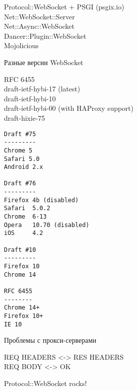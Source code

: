 \documentclass[14pt]{beamer}
\begin{document}
\begin{frame}
    \begin{center}
        Protocol::WebSocket + PSGI (psgix.io)\\
        Net::WebSocket::Server\\
        Net::Async::WebSocket\\
        Dancer::Plugin::WebSocket\\
        Mojolicious
    \end{center}
\end{frame}

\begin{frame}
    \begin{center}
        Разные версии WebSocket

        RFC 6455\\
        draft-ietf-hybi-17 (latest)\\
        draft-ietf-hybi-10\\
        draft-ietf-hybi-00 (with HAProxy support)\\
        draft-hixie-75
    \end{center}
\end{frame}

\begin{frame}[fragile]
    \begin{lstlisting}
Draft #75
---------
Chrome 5
Safari 5.0
Android 2.x

Draft #76
---------
Firefox 4b (disabled)
Safari  5.0.2
Chrome  6-13
Opera   10.70 (disabled)
iOS     4.2

Draft #10
---------
Firefox 10
Chrome 14

RFC 6455
--------
Chrome 14+
Firefox 10+
IE 10
    \end{lstlisting}
\end{frame}

\begin{frame}
    \begin{center}
        Проблемы с прокси-серверами

        REQ HEADERS <-> RES HEADERS \\
        REQ BODY    <-> OK
    \end{center}
\end{frame}

\begin{frame}
    \begin{center}
        Protocol::WebSocket rocks!
    \end{center}
\end{frame}
\end{document}
